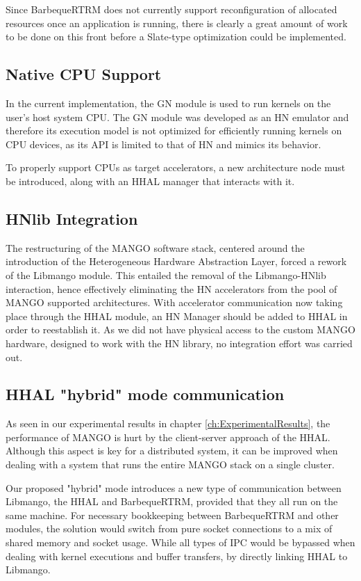 Since BarbequeRTRM does not currently support reconfiguration of allocated resources once an application is running, there is clearly a great amount of work to be done on this front before a Slate-type optimization could be implemented.

\subsection{Native CPU Support}

In the current implementation, the GN module is used to run kernels on the user's host system CPU. The GN module was developed as an HN emulator and therefore its execution model is not optimized for efficiently running kernels on CPU devices, as its API is limited to that of HN and mimics its behavior.

To properly support CPUs as target accelerators, a new architecture node must be introduced, along with an HHAL manager that interacts with it.

\subsection{HNlib Integration}

The restructuring of the MANGO software stack, centered around the introduction of the Heterogeneous Hardware Abstraction Layer, forced a rework of the Libmango module. This entailed the removal of the Libmango-HNlib interaction, hence effectively eliminating the HN accelerators from the pool of MANGO supported architectures.
With accelerator communication now taking place through the HHAL module, an HN Manager should be added to HHAL in order to reestablish it.
As we did not have physical access to the custom MANGO hardware, designed to work with the HN library, no integration effort was carried out.

\subsection{HHAL "hybrid" mode communication} \label{sub-sect:hhal-hybrid-mode}

As seen in our experimental results in chapter \ref{ch:ExperimentalResults}, the performance of MANGO is hurt by the client-server approach of the HHAL. Although this aspect is key for a distributed system, it can be improved when dealing with a system that runs the entire MANGO stack on a single cluster. 

Our proposed "hybrid" mode introduces a new type of communication between Libmango, the HHAL and BarbequeRTRM, provided that they all run on the same machine. For necessary bookkeeping between BarbequeRTRM and other modules, the solution would switch from pure socket connections to a mix of shared memory and socket usage. While all types of IPC would be bypassed when dealing with kernel executions and buffer transfers, by directly linking HHAL to Libmango.

